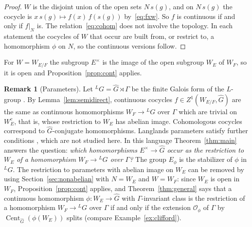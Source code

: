 \documentclass[12pt,letterpaper]{article}
\numberwithin{equation}{section}
\theoremstyle{plain}
\theoremstyle{definition}
\newtheorem{remark}[theorem]{Remark}
\newcommand{\Gh}{\widehat{G}}
\newcommand{\LG}{{}^{L}G}
\DeclareMathOperator{\Cent}{Cent}
\begin{document}
\begin{proof}
$W$ is the disjoint union of the open sets $N\,s(g)$, and on $N\,s(g)$ the
cocycle is $x\,s(g)\mapsto f(x)\,f(s(g))$ by~\eqref{eq:fxw}. So $f$ is
continuous if and only if $f|_N$ is. The relation~\eqref{eq:cohom} does not
involve the topology. In each statement the cocycles of $W$ that occur are
built from, or restrict to, a homomorphism $\phi$ on $N$, so the
continuous versions follow.
\end{proof}

For $W=W_{E/F}$ the subgroup $E^\times$ is the image of the open subgroup
$W_E$ of $W_F$, so it is open and Proposition~\ref{prop:cont} applies.

\begin{remark}[Parameters]\label{rem:parameters}
Let $\LG=\Gh\rtimes\Gamma$ be the finite Galois form of the $L$-group
\cite{Bo79}. By Lemma~\ref{lem:semidirect}, continuous cocycles
$f\in Z^1(W_{E/F},\Gh)$ are the same as continuous homomorphisms
$W_F\to\LG$ over $\Gamma$ which are trivial on $W_E^c$, that is, whose
restriction to $W_E$ has abelian image. Cohomologous cocycles
correspond to $\Gh$-conjugate homomorphisms. Langlands parameters satisfy
further conditions \cite[\S8]{Bo79}, which are not studied here. In this
language Theorem~\ref{thm:main} answers the question: \emph{which
homomorphisms $E^\times\to\Gh$ occur as the restriction to $W_E$ of a
homomorphism $W_F\to\LG$ over $\Gamma$?} The group $E_\phi$ is the
stabilizer of $\phi$ in $\LG$. The restriction to parameters with abelian
image on $W_E$ can be removed by using Section~\ref{sec:nonabelian} with
$N=W_E$ and $W=W_F$: since $W_E$ is open in $W_F$,
Proposition~\ref{prop:cont} applies, and Theorem~\ref{thm:general} says
that a continuous homomorphism $\phi:W_E\to\Gh$ with $\Gamma$-invariant
class is the restriction of a homomorphism $W_F\to\LG$ over $\Gamma$ if
and only if the extension $\mathcal{O}_\phi$ of $\Gamma$ by
$\Cent_{\Gh}(\phi(W_E))$ splits (compare Example~\ref{ex:clifford}).
\end{remark}
\end{document}
